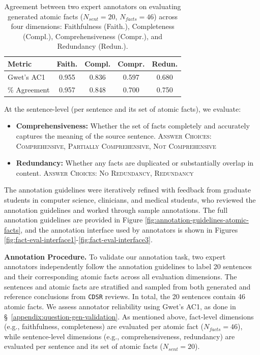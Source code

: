 \documentclass{article}
\newcommand{\xhdr}[1]{%
  \noindent\textbf{#1.}
}
\begin{document}
\begin{table}[t]
\centering
\footnotesize
\setlength{\tabcolsep}{4pt}
\caption{Agreement between two expert annotators on evaluating generated atomic facts ($N_{sent}=20$, $N_{facts}=46$) across four dimensions: Faithfulness (Faith.), Completeness (Compl.), Comprehensiveness (Compr.), and Redundancy (Redun.).}
\label{tab:inter-annotator-afg}

\begin{tabular}{lcccc}
\toprule
\textbf{Metric} & \textbf{Faith.} & \textbf{Compl.} & \textbf{Compr.} & \textbf{Redun.} \\
\midrule
Gwet's AC1 
& 0.955 & 0.836 & 0.597 & 0.680 \\
\% Agreement 
& 0.957 & 0.848 & 0.700 & 0.750 \\
\bottomrule
\end{tabular}
\end{table}

At the sentence-level (per sentence and its set of atomic facts), we evaluate:
\begin{itemize}[leftmargin=0.6cm]
    \item \textbf{Comprehensiveness:} Whether the set of facts completely and accurately captures the meaning of the source sentence. \textsc{Answer Choices: Comprehensive, Partially Comprehensive, Not Comprehensive}
    \item \textbf{Redundancy:} Whether any facts are duplicated or substantially overlap in content. \textsc{Answer Choices: No Redundancy, Redundancy}
\end{itemize}

The annotation guidelines were iteratively refined with feedback from graduate students in computer science, clinicians, and medical students, who reviewed the annotation guidelines and worked through sample annotations. The full annotation guidelines are provided in Figure \ref{fig:annotation-guidelines-atomic-facts}, and the annotation interface used by annotators is shown in Figures \ref{fig:fact-eval-interface1}-\ref{fig:fact-eval-interface3}. 








\xhdr{Annotation Procedure} To validate our annotation task, two expert annotators independently follow the annotation guidelines to label 20 sentences and their corresponding atomic facts across all evaluation dimensions. The sentences and atomic facts are stratified and sampled from both generated and reference conclusions from \texttt{CDSR} reviews. In total, the 20 sentences contain 46 atomic facts. We assess annotator reliability using Gwet’s AC1, as done in \S~\ref{appendix:question-gen-validation}. As mentioned above, fact-level dimensions (e.g., faithfulness, completeness) are evaluated per atomic fact ($N_{facts}{=}46$), while sentence-level dimensions (e.g., comprehensiveness, redundancy) are evaluated per sentence and its set of atomic facts ($N_{sent}{=}20$).
\end{document}
